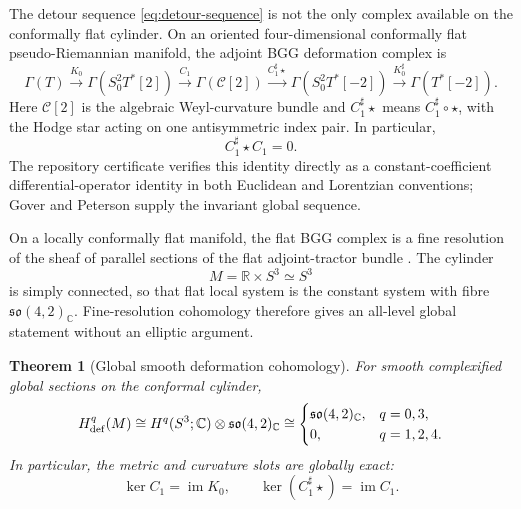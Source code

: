 \documentclass[11pt]{article}
\newtheorem{theorem}{Theorem}[section]
\theoremstyle{definition}
\theoremstyle{remark}
\newcommand{\C}{\mathbb C}
\newcommand{\R}{\mathbb R}
\newcommand{\im}{\operatorname{im}}
\begin{document}
The detour sequence \eqref{eq:detour-sequence} is not the only complex
available on the conformally flat cylinder.  On an oriented
four-dimensional conformally flat pseudo-Riemannian manifold, the adjoint
BGG deformation complex is \cite{GoverPeterson,CapBGG}
\begin{equation}\label{eq:BGG-sequence}
 \Gamma(T)
 \xrightarrow{K_0}
 \Gamma(S^2_0T^*[2])
 \xrightarrow{C_1}
 \Gamma(\mathcal C[2])
 \xrightarrow{C_1^\sharp\star}
 \Gamma(S^2_0T^*[-2])
 \xrightarrow{K_0^\sharp}
 \Gamma(T^*[-2]).
\end{equation}
Here $\mathcal C[2]$ is the algebraic Weyl-curvature bundle and
$C_1^\sharp\star$ means $C_1^\sharp\circ\star$, with the Hodge star acting
on one antisymmetric index pair.  In particular,
\begin{equation}\label{eq:star-complex-identity}
 \boxed{C_1^\sharp\star C_1=0.}
\end{equation}
The repository certificate verifies this identity directly as a
constant-coefficient differential-operator identity in both Euclidean and
Lorentzian conventions; Gover and Peterson supply the invariant global
sequence.

On a locally conformally flat manifold, the flat BGG complex is a fine
resolution of the sheaf of parallel sections of the flat adjoint-tractor
bundle \cite{CapDeformations,CapBGG}.  The cylinder
\begin{equation}
 M=\R\times S^3\simeq S^3
\end{equation}
is simply connected, so that flat local system is the constant system with
fibre $\mathfrak{so}(4,2)_\C$.  Fine-resolution cohomology therefore gives
an all-level global statement without an elliptic argument.

\begin{theorem}[Global smooth deformation cohomology]
\label{thm:global-BGG}
For smooth complexified global sections on the conformal cylinder,
\begin{equation}\label{eq:global-BGG-cohomology}
 H^q_{\rm def}(M)
 \cong H^q(S^3;\C)\otimes\mathfrak{so}(4,2)_\C
 \cong
 \begin{cases}
  \mathfrak{so}(4,2)_\C,&q=0,3,\\
  0,&q=1,2,4.
 \end{cases}
\end{equation}
In particular, the metric and curvature slots are globally exact:
\begin{equation}\label{eq:global-BGG-exactness}
 \boxed{\ker C_1=\im K_0,}
 \qquad
 \boxed{\ker(C_1^\sharp\star)=\im C_1.}
\end{equation}
\end{theorem}
\end{document}
